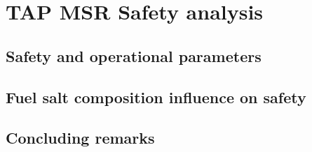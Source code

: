 \chapter{TAP MSR Safety analysis}

\section{Safety and operational parameters}

\section{Fuel salt composition influence on safety}

\section{Concluding remarks}
